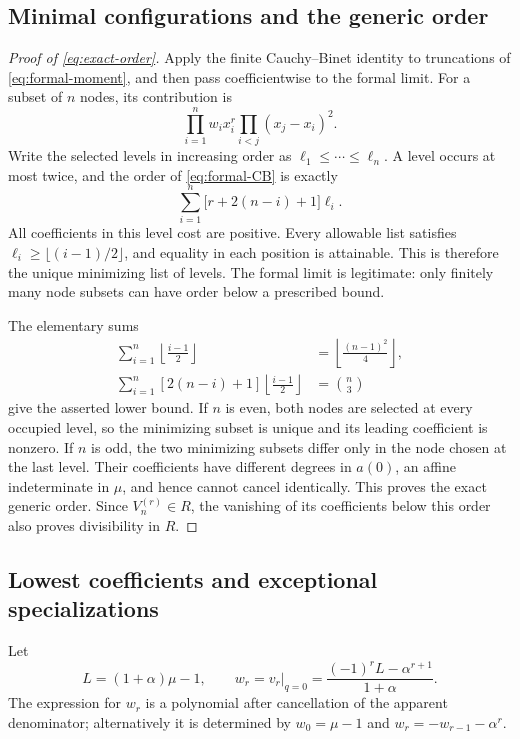 \documentclass[11pt]{article}
\numberwithin{equation}{section}
\theoremstyle{definition}
\theoremstyle{remark}
\newcommand{\fl}[1]{\left\lfloor#1\right\rfloor}
\begin{document}
\subsection{Minimal configurations and the generic order}

\begin{proof}[Proof of \eqref{eq:exact-order}]
Apply the finite Cauchy--Binet identity to truncations of
\eqref{eq:formal-moment}, and then pass coefficientwise to the formal limit.
For a subset of $n$ nodes, its contribution is
\begin{equation}\label{eq:formal-CB}
 \prod_{i=1}^{n}w_ix_i^r\prod_{i<j}(x_j-x_i)^2.
\end{equation}
Write the selected levels in increasing order as
$\ell_1\le\cdots\le\ell_n$. A level occurs at most twice, and the order
of \eqref{eq:formal-CB} is exactly
\begin{equation}\label{eq:level-cost}
 \sum_{i=1}^{n}\bigl[r+2(n-i)+1\bigr]\ell_i.
\end{equation}
All coefficients in this level cost are positive. Every allowable list satisfies
$\ell_i\ge\lfloor(i-1)/2\rfloor$, and equality in each position is
attainable. This is therefore the unique minimizing list of levels.
The formal limit is legitimate: only finitely many node subsets can have
order below a prescribed bound.

The elementary sums
\begin{align*}
 \sum_{i=1}^{n}\fl{\frac{i-1}{2}}
 &=\fl{\frac{(n-1)^2}{4}},\\
 \sum_{i=1}^{n}[2(n-i)+1]\fl{\frac{i-1}{2}}
 &=\binom n3
\end{align*}
give the asserted lower bound. If $n$ is even, both nodes are selected at
every occupied level, so the minimizing subset is unique and its leading
coefficient is nonzero. If $n$ is odd, the two minimizing subsets differ
only in the node chosen at the last level. Their coefficients have different
degrees in $a(0)$, an affine indeterminate in $\mu$, and hence cannot cancel
identically. This proves the exact generic order.
Since $V_n^{(r)}\in R$, the vanishing of its coefficients below this order
also proves divisibility in $R$.
\end{proof}

\subsection{Lowest coefficients and exceptional specializations}

Let
\begin{equation}\label{eq:L-w}
 L=(1+\alpha)\mu-1,\qquad
 w_r=v_r|_{q=0}=\frac{(-1)^rL-\alpha^{r+1}}{1+\alpha}.
\end{equation}
The expression for $w_r$ is a polynomial after cancellation of the apparent
denominator; alternatively it is determined by $w_0=\mu-1$ and
$w_r=-w_{r-1}-\alpha^r$.
\end{document}
